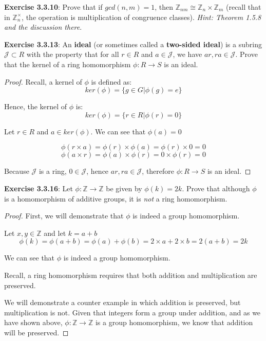 \documentclass[a4paper]{article}
\begin{document}
\begin{myparindent}{0pt}
\textbf{Exercise 3.3.10}:
Prove that if $gcd(n, m) = 1$, then
$\mathbb{Z}_{nm} \cong \mathbb{Z}_n \times \mathbb{Z}_m$
(recall that in $\mathbb{Z}_n^\times$, the operation is multiplication of
congruence classes). \textit{Hint: Theorem 1.5.8 and the discussion there}.
\newline

\textbf{Exercise 3.3.13}:
An \textbf{ideal} (or sometimes called a \textbf{two-sided ideal}) is a
subring $\mathcal{J} \subset R$ with the property that for all
$r \in R$ and $a \in \mathcal{J}$, we have $ar, ra \in \mathcal{J}$.
Prove that the kernel of a ring homomorphism $\phi: R \rightarrow S$ is an ideal.
\newline

\begin{proof}
  Recall, a kernel of $\phi$ is defined as:
  \[ ker(\phi) = \{ g \in G | \phi(g) = e \} \]

  Hence, the kernel of $\phi$ is:
  \[ ker(\phi) = \{ r \in R | \phi(r) = 0 \} \]

  Let $r \in R$ and $a \in ker(\phi)$. We can see that $\phi(a) = 0$

  \[ \phi(r \times a) = \phi(r) \times \phi(a) = \phi(r) \times 0 = 0 \]
  \[ \phi(a \times r) = \phi(a) \times \phi(r) = 0 \times \phi(r) = 0 \]

  Because $\mathcal{J}$ is a ring, $0 \in \mathcal{J}$, hence $ar, ra \in \mathcal{J}$,
  therefore $\phi: R \rightarrow S$ is an ideal.
\end{proof}

\textbf{Exercise 3.3.16}:
Let $\phi: \mathbb{Z} \rightarrow \mathbb{Z}$ be given by $\phi(k) = 2k$. Prove
that although $\phi$ is a homomorphism of additive groups, it is \textit{not}
a ring homomorphism.

\begin{proof}
  First, we will demonstrate that $\phi$ is indeed a group homomorphism. \newline

  Let $x, y \in \mathbb{Z}$ and let $k = a + b$
  \[ \phi(k) = \phi(a + b) = \phi(a) + \phi(b) = 2 \times a + 2 \times b =
  2(a + b) = 2k
  \]

  We can see that $\phi$ is indeed a group homomorphism. \newline

  Recall, a ring homomorphism requires that both addition and multiplication
  are preserved. \newline

  We will demonstrate a counter example in which addition is preserved, but
  multiplication is not. Given that integers form a group under addition,
  and as we have shown above, $\phi: \mathbb{Z} \rightarrow \mathbb{Z}$ is a
  group homomorphism, we know that addition will be preserved. \newline


\end{proof}
\end{myparindent}
\end{document}
